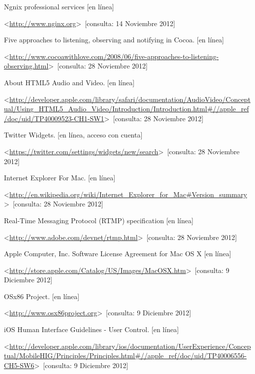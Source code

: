 \begin{thebibliography}{99}
\begin{sloppypar}
%
Ngnix professional services [en línea]\

\textless \url{http://www.nginx.org}\textgreater \ [consulta: 14 Noviembre 2012]

%
Five approaches to listening, observing and notifying in Cocoa. [en línea]\

\textless \url{http://www.cocoawithlove.com/2008/06/five-approaches-to-listening-observing.html}\textgreater \ [consulta: 28 Noviembre 2012]

%
About HTML5 Audio and Video. [en línea]\

\textless \url{http://developer.apple.com/library/safari/documentation/AudioVideo/Conceptual/Using_HTML5_Audio_Video/Introduction/Introduction.html\#//apple_ref/doc/uid/TP40009523-CH1-SW1}\textgreater \ [consulta: 28 Noviembre 2012]

%
Twitter Widgets. [en línea, acceso con cuenta]\

\textless \url{https://twitter.com/settings/widgets/new/search}\textgreater \ [consulta: 28 Noviembre 2012]

%
Internet Explorer For Mac. [en línea]\

\textless \url{http://en.wikipedia.org/wiki/Internet_Explorer_for_Mac\#Version_summary}\textgreater \ [consulta: 28 Noviembre 2012]

%
Real-Time Messaging Protocol (RTMP) specification [en línea]\

\textless \url{http://www.adobe.com/devnet/rtmp.html}\textgreater \ [consulta: 28 Noviembre 2012]

%
Apple Computer, Inc. Software License Agreement for Mac OS X [en línea]\

\textless \url{http://store.apple.com/Catalog/US/Images/MacOSX.htm}\textgreater \ [consulta: 9 Diciembre 2012]

%
OSx86 Project. [en línea]\

\textless \url{http://www.osx86project.org}\textgreater \ [consulta: 9 Diciembre 2012]

%
iOS Human Interface Guidelines - User Control. [en línea]\

\textless \url{http://developer.apple.com/library/ios/documentation/UserExperience/Conceptual/MobileHIG/Principles/Principles.html\#//apple_ref/doc/uid/TP40006556-CH5-SW6}\textgreater \ [consulta: 9 Diciembre 2012]


\end{sloppypar}
\end{thebibliography}
